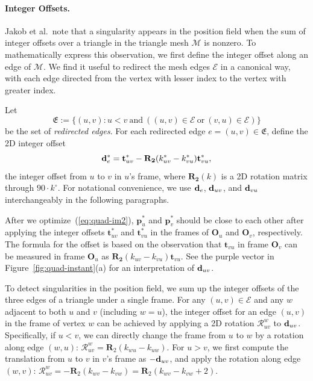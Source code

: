 \paragraph*{Integer Offsets.}
Jakob et al.\ note that a singularity appears in the position field when the sum of integer offsets over a triangle in the triangle mesh $\mathcal{M}$ is nonzero. To mathematically express this observation, we first define the integer offset along an edge of $\mathcal{M}$. We find it useful to redirect the mesh edges $\mathcal{E}$ in a canonical way, with each edge directed from the vertex with lesser index to the vertex with greater index.
\begin{defn}
Let
\[
\mathfrak{E}:=\{ (u,v): u < v \mathrm{~and~} ( (u,v) \in \mathcal{E} \mathrm{~or~} (v,u) \in \mathcal{E}) \}
\]
be the set of \emph{redirected edges}.  For each redirected edge $e=(u,v) \in \mathfrak{E}$, define the 2D integer offset
\[
{\mathbf{d}}^*_e= \textbf{t}^*_{uv}-\mathbf{R_2} (k^*_{uv} - k^*_{vu})\textbf{t}^*_{vu},
\]
the integer offset from $u$ to $v$ in $u$'s frame, where $\mathbf{R_2}(k)$ is a 2D rotation matrix through $90 \cdot k^{\circ}$.  For notational convenience, we use ${\mathbf{d}}_e$, ${\mathbf{d}}_{uv}$, and ${\mathbf{d}}_{vu}$ interchangeably in the following paragraphs.
\end{defn}

After we optimize~(\ref{eq:quad-im2}), $\textbf{p}^*_u$ and $\textbf{p}^*_v$ should be close to each other after applying the integer offsets $\textbf{t}^*_{uv}$ and $\textbf{t}^*_{vu}$ in the frames of $\textbf{O}_u$ and $\textbf{O}_v$, respectively. The formula for the offset is based on the observation that $\textbf{t}_{vu}$ in frame $\textbf{O}_v$ can be measured in frame $\textbf{O}_u$ as $\mathbf{R_2}(k_{uv}-k_{vu})\textbf{t}_{vu}$. See the purple vector in Figure~\ref{fig:quad-instant}(a) for an interpretation of ${\mathbf{d}}_{uv}$.

To detect singularities in the position field, we sum up the integer offsets of the three edges of a triangle under a single frame. For any $(u,v)\in\mathcal{E}$ and any $w$ adjacent to both $u$ and $v$ (including $w=u$), the integer offset for an edge $(u,v)$ in the frame of vertex $w$ can be achieved by applying a 2D rotation $\mathcal{R}^w_{uv}$ to ${\mathbf{d}}_{uv}$. Specifically, if $u<v$, we can directly change the frame from $u$ to $w$ by a rotation along edge $(w,u)$: $\mathcal{R}^w_{uv}=\mathbf{R}_2(k_{wu}-k_{uw})$. For $u>v$, we first compute the translation from $u$ to $v$ in $v$'s frame as $-{\mathbf{d}}_{uv}$, and apply the rotation along edge $(w,v)$: $\mathcal{R}^w_{uv}=-\mathbf{R}_2(k_{wv}-k_{vw})=\mathbf{R}_2(k_{wv}-k_{vw}+2)$.

